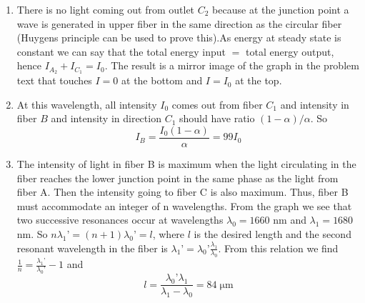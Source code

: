 \begin{custom-simple}[Problem 16]
\begin{enumerate}
\item There is no light coming out from outlet $C_2$ because at the junction point a wave is generated in upper fiber in the same direction as the circular fiber (Huygens principle can be used to prove this).As energy at steady state is constant we can say that the total energy input $=$ total energy output, hence $I_{A_2}+I_{C_1}=I_0$. The result is a mirror image of the graph in the problem text that touches $I = 0$ at the bottom and $I = I_0$ at the top.
\item At this wavelength, all intensity $I_0$ comes out from fiber $C_1$ and intensity in fiber $B$ and intensity in direction $C_1$ should have ratio $(1-\alpha)/\alpha$. So $$I_B = \frac{I_0(1-\alpha)}{\alpha} = 99I_0$$
\item The intensity of light in fiber B is maximum when the light circulating in the fiber reaches the lower junction point in the same phase as the light from fiber A. Then the intensity going to fiber C is also maximum. Thus, fiber B must accommodate an integer of n wavelengths. From the graph we see that two successive resonances occur at wavelengths $\lambda_0 = 1660$ nm and $\lambda_1 = 1680$ nm. So $n\lambda_1 ’ = (n+1) \lambda_0 ’= l$, where $l$ is the desired length and the second resonant wavelength in the fiber is $\lambda_1 ’ = \lambda_0 ’\frac{\lambda_1 }{\lambda_0}$. From this relation we find $\frac{1}{n}= \frac{\lambda_1 ’}{\lambda_0 ’} - 1$ and
$$ l = \frac {\lambda_0 ’\lambda_1}{\lambda_1-\lambda_0} = \boxed{84\;\mathrm{\mu m}}$$
\end{enumerate}
\end{custom-simple}